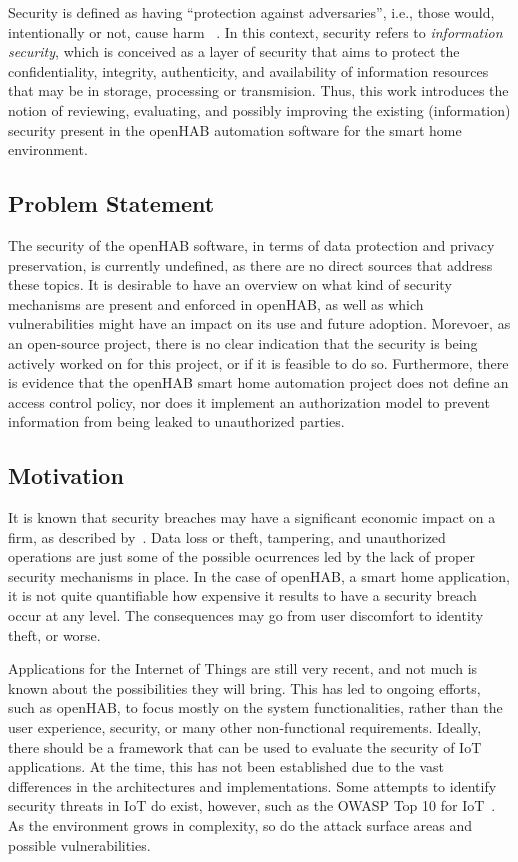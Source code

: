 \documentclass[12pt]{article}
\begin{document}
Security is defined as having ``protection against adversaries'', i.e., those would, intentionally or not, cause harm~\cite{whitman2011principles} . In this context, security refers to \emph{information security}, which is conceived as a layer of security that aims to protect the confidentiality, integrity, authenticity, and availability of information resources that may be in storage, processing or transmision. Thus, this work introduces the notion of reviewing, evaluating, and possibly improving the existing (information) security present in the openHAB automation software for the smart home environment.

\subsection{Problem Statement}

The security of the openHAB software, in terms of data protection and privacy preservation, is currently undefined, as there are no direct sources that address these topics. It is desirable to have an overview on what kind of security mechanisms are present and enforced in openHAB, as well as which vulnerabilities might have an impact on its use and future adoption. Morevoer, as an open-source project, there is no clear indication that the security is being actively worked on for this project, or if it is feasible to do so. Furthermore, there is evidence that the openHAB smart home automation project does not define an access control policy, nor does it implement an authorization model to prevent information from being leaked to unauthorized parties. 

\subsection{Motivation}

It is known that security breaches may have a significant economic impact on a firm, as described by~\cite{GOEL}. Data loss or theft, tampering, and unauthorized operations are just some of the possible ocurrences led by the lack of proper security mechanisms in place. In the case of openHAB, a smart home application, it is not quite quantifiable how expensive it results to have a security breach occur at any level. The consequences may go from user discomfort to identity theft, or worse.

Applications for the Internet of Things are still very recent, and not much is known about the possibilities they will bring. This has led to ongoing efforts, such as openHAB, to focus mostly on the system functionalities, rather than the user experience, security, or many other non-functional requirements. Ideally, there should be a framework that can be used to evaluate the security of IoT applications. At the time, this has not been established due to the vast differences in the architectures and implementations. Some attempts to identify security threats in IoT do exist, however, such as the OWASP Top 10 for IoT~\cite{owasp}. As the environment grows in complexity, so do the attack surface areas and possible vulnerabilities.
\end{document}
